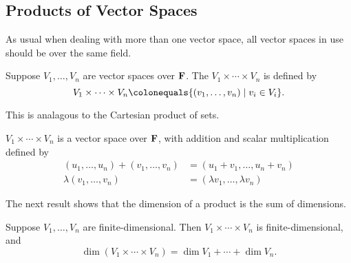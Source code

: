 \subsection{Products of Vector Spaces}
As usual when dealing with more than one vector space, all vector spaces in use should be over the same field.

\begin{definition}[Product]
Suppose $V_1,\dots,V_n$ are vector spaces over $\mathbf F$. The  $V_1\times\cdots\times V_n$ is defined by
\[V_1\times\cdots\times V_n\colonequals\{(v_1,\dots,v_n)\mid v_i\in V_i\}.\]
\end{definition}

\begin{remark}
This is analagous to the Cartesian product of sets.
\end{remark}

\begin{lemma}
$V_1\times\cdots\times V_n$ is a vector space over $\mathbf F$, with addition and scalar multiplication defined by
\begin{align*}
(u_1,\dots,u_n)+(v_1,\dots,v_n)&=(u_1+v_1,\dots,u_n+v_n)\\
\lambda(v_1,\dots,v_n)&=(\lambda v_1,\dots,\lambda v_n)
\end{align*}
\end{lemma}

The next result shows that the dimension of a product is the sum of dimensions.

\begin{lemma}\label{lemma:dimension-product}
Suppose $V_1,\dots,V_n$ are finite-dimensional. Then $V_1\times\cdots\times V_n$ is finite-dimensional, and
\[\dim(V_1\times\cdots\times V_n)=\dim V_1+\cdots+\dim V_n.\]
\end{lemma}

